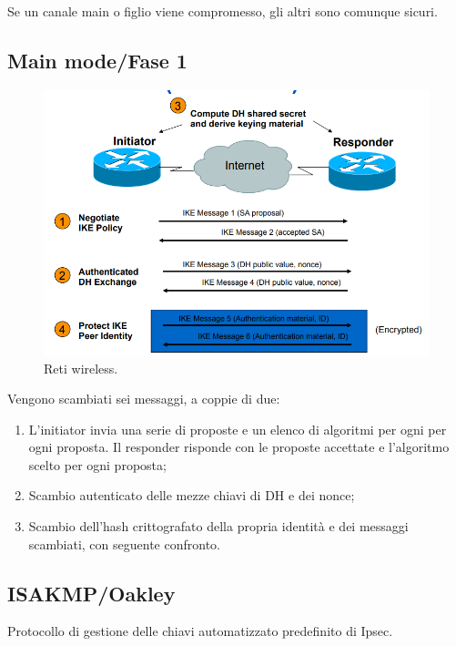Se un canale main o figlio viene compromesso, gli altri sono comunque sicuri.

\subsection{Main mode/Fase 1}

\begin{figure}[h]
    \centering
    \includegraphics[width=1\textwidth]{images/chapter9/9-13.png}
    \caption{Reti wireless.}
    \label{fig:9-13}
\end{figure}

Vengono scambiati sei messaggi, a coppie di due:
\begin{enumerate}
    \item L'initiator invia una serie di proposte e un elenco di algoritmi per ogni per ogni proposta. Il responder risponde con le proposte accettate e l'algoritmo scelto per ogni proposta;
	\item Scambio autenticato delle mezze chiavi di DH e dei nonce;
	\item Scambio dell'hash crittografato della propria identità e dei messaggi scambiati, con seguente confronto.
\end{enumerate}

\subsection{ISAKMP/Oakley}

Protocollo di gestione delle chiavi automatizzato predefinito di Ipsec.


